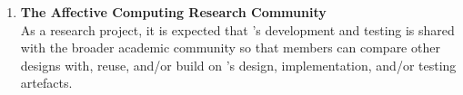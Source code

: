 \begin{itemize}
\begin{enumerate}
        \item \textbf{The Affective Computing Research Community} \\
        As a research project, it is expected that \progname{}'s development
        and testing is shared with the broader academic community so that
        members can compare other designs with, reuse, and/or build on
        \progname{}'s design, implementation, and/or testing artefacts.

    \end{enumerate}
\end{itemize}